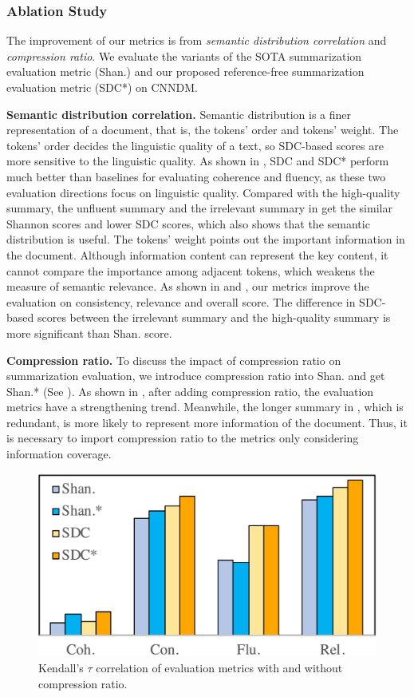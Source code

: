 \subsubsection{Ablation Study}
The improvement of our metrics is from {\em semantic distribution correlation}
and {\em compression ratio}. We evaluate the variants of the SOTA summarization evaluation metric (Shan.) and our proposed reference-free summarization evaluation metric (SDC*) on CNNDM.

\textbf{Semantic distribution correlation.}
Semantic distribution is a finer representation of a document,
that is, the tokens' order and tokens' weight.
The tokens' order decides the linguistic quality of a text, 
so SDC-based scores are more sensitive to the linguistic quality.
As shown in , SDC and SDC* perform much better than 
baselines for evaluating coherence and fluency, 
as these two evaluation directions focus on linguistic quality.
Compared with the high-quality summary, the unfluent summary and the irrelevant summary in  get the similar Shannon scores and lower SDC scores,
which also shows that the semantic distribution is useful.
The tokens' weight points out the important information in the document.
Although information content can represent the key content,
it cannot compare the importance among adjacent tokens,
which weakens the measure of semantic relevance.
As shown in  and ,
our metrics improve the evaluation on consistency, relevance and overall score.
The difference in SDC-based scores between the irrelevant summary and the high-quality summary is more significant than Shan. score.

\textbf{Compression ratio.}
To discuss the impact of compression ratio on summarization evaluation,
we introduce compression ratio into Shan. and get Shan.* (See ).
As shown in , after adding compression ratio, 
the evaluation metrics have a strengthening trend.
Meanwhile, the longer summary in , which is redundant, is more likely to represent more information of the document. Thus, it is necessary to import compression ratio to the metrics only considering information coverage.

\begin{figure}[th]
	\centering
	\includegraphics[width=0.65\linewidth]{comp.pdf}
	\caption{Kendall's $\tau$ correlation of evaluation metrics with and without compression ratio.}
	\label{fig:cr}
\end{figure}








